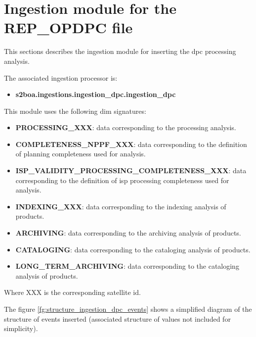 \section{Ingestion module for the REP\_OPDPC file}

This sections describes the ingestion module for inserting the \acrshort{dpc} processing analysis.

The associated ingestion processor is:

\begin{itemize} 

\item \textbf{s2boa.ingestions.ingestion\_dpc.ingestion\_dpc}
  
\end{itemize}

This module uses the following \acrshort{dim} signatures:

\begin{itemize} 

\item \textbf{PROCESSING\_XXX}: data corresponding to the processing analysis.

\item \textbf{COMPLETENESS\_NPPF\_XXX}: data corresponding to the definition of planning completeness used for analysis.

\item \textbf{ISP\_VALIDITY\_PROCESSING\_COMPLETENESS\_XXX}: data corresponding to the definition of \acrshort{isp} processing completeness used for analysis.

\item \textbf{INDEXING\_XXX}: data corresponding to the indexing analysis of products.

\item \textbf{ARCHIVING}: data corresponding to the archiving analysis of products.

\item \textbf{CATALOGING}: data corresponding to the cataloging analysis of products.

\item \textbf{LONG\_TERM\_ARCHIVING}: data corresponding to the cataloging analysis of products.

\end{itemize}

Where XXX is the corresponding satellite id.

The figure \ref{fg:structure_ingestion_dpc_events} shows a simplified diagram of the structure of events inserted (associated structure of values not included for simplicity).


